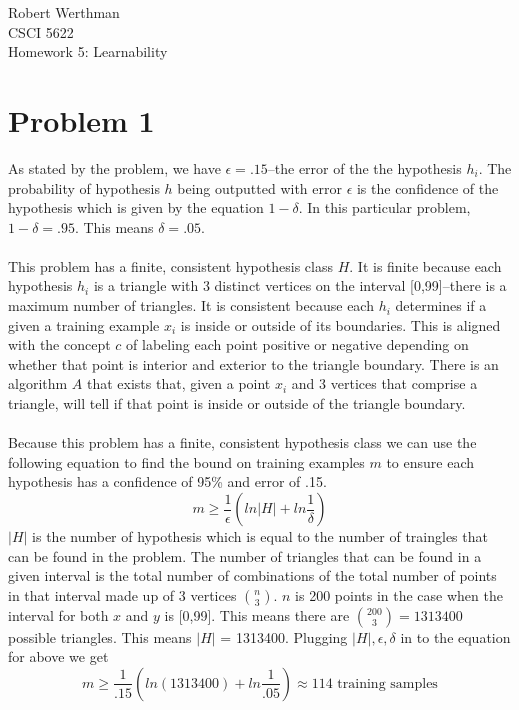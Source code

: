 \documentclass[12pt]{article}
\begin{document}
\noindent
Robert Werthman\\
CSCI 5622\\
Homework 5: Learnability\\

\section*{Problem 1}
As stated by the problem, we have $\epsilon = .15$--the error of the the hypothesis $h_i$.  The probability of hypothesis $h$ being outputted with error $\epsilon$ is the confidence of the hypothesis which is given by the equation $1 - \delta$.  In this particular problem, $1 - \delta = .95$.  This means $\delta = .05$.\\
\\
This problem has a finite, consistent hypothesis class $H$.  It is finite because each hypothesis $h_i$ is a triangle with 3 distinct vertices on the interval [0,99]--there is a maximum number of triangles.  It is consistent because each $h_i$ determines if a given a training example $x_i$ is inside or outside of its boundaries.  This is aligned with the concept $c$ of labeling each point positive or negative depending on whether that point is interior and exterior to the triangle boundary.  There is an algorithm $A$ that exists that, given a point $x_i$ and 3 vertices that comprise a triangle, will tell if that point is inside or outside of the triangle boundary.\\
\\
Because this problem has a finite, consistent hypothesis class we can use the following equation to find the bound on training examples $m$ to ensure each hypothesis has a confidence of 95\% and error of .15.
\[
m \ge \frac{1}{\epsilon}(ln|H| + ln\frac{1}{\delta})
\]  
$|H|$ is the number of hypothesis which is equal to the number of traingles that can be found in the problem.  The number of triangles that can be found in a given interval is the total number of combinations of the total number of points in that interval made up of 3 vertices $\binom{n}{3}$.  $n$ is 200 points in the case when the interval for both $x$ and $y$ is [0,99].  This means there are $\binom{200}{3} = 1313400$ possible triangles.  This means $|H|$ = 1313400.  Plugging $|H|, \epsilon, \delta$ in to the equation for above we get
\[
m \ge \frac{1}{.15}(ln(1313400) + ln\frac{1}{.05}) \approx 114 \text{ training samples}
\]
\end{document}
